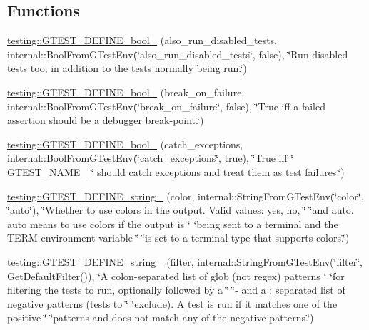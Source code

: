 \subsection*{Functions}
\begin{DoxyCompactItemize}
\item 
\mbox{\hyperlink{namespacetesting_ad72f215c805a46fba44cb09d717b01ef}{testing\+::\+G\+T\+E\+S\+T\+\_\+\+D\+E\+F\+I\+N\+E\+\_\+bool\+\_\+}} (also\+\_\+run\+\_\+disabled\+\_\+tests, internal\+::\+Bool\+From\+G\+Test\+Env(\char`\"{}also\+\_\+run\+\_\+disabled\+\_\+tests\char`\"{}, false), \char`\"{}Run disabled tests too, in addition to the tests normally being run.\char`\"{})
\item 
\mbox{\hyperlink{namespacetesting_a5ab9e9cc2ee1addddfb2f4b43dd4e402}{testing\+::\+G\+T\+E\+S\+T\+\_\+\+D\+E\+F\+I\+N\+E\+\_\+bool\+\_\+}} (break\+\_\+on\+\_\+failure, internal\+::\+Bool\+From\+G\+Test\+Env(\char`\"{}break\+\_\+on\+\_\+failure\char`\"{}, false), \char`\"{}True iff a failed assertion should be a debugger break-\/point.\char`\"{})
\item 
\mbox{\hyperlink{namespacetesting_a96c82869676822ec883043aefb6dd042}{testing\+::\+G\+T\+E\+S\+T\+\_\+\+D\+E\+F\+I\+N\+E\+\_\+bool\+\_\+}} (catch\+\_\+exceptions, internal\+::\+Bool\+From\+G\+Test\+Env(\char`\"{}catch\+\_\+exceptions\char`\"{}, true), \char`\"{}True iff \char`\"{} G\+T\+E\+S\+T\+\_\+\+N\+A\+M\+E\+\_\+ \char`\"{} should catch exceptions and treat them as \mbox{\hyperlink{_mutual_8h_a707ee03719e99670bf6cfdfd897b8456}{test}} failures.\char`\"{})
\item 
\mbox{\hyperlink{namespacetesting_a32f0280e95e7718835b0e3d2f7277269}{testing\+::\+G\+T\+E\+S\+T\+\_\+\+D\+E\+F\+I\+N\+E\+\_\+string\+\_\+}} (color, internal\+::\+String\+From\+G\+Test\+Env(\char`\"{}color\char`\"{}, \char`\"{}auto\char`\"{}), \char`\"{}Whether to use colors in the output.  Valid values\+: yes, no, \char`\"{} \char`\"{}and auto.  \textquotesingle{}auto\textquotesingle{} means to use colors if the output is \char`\"{} \char`\"{}being sent to a terminal and the T\+E\+RM environment variable \char`\"{} \char`\"{}is set to a terminal type that supports colors.\char`\"{})
\item 
\mbox{\hyperlink{namespacetesting_a2830ee1f2237233fa44aa580c5a919ce}{testing\+::\+G\+T\+E\+S\+T\+\_\+\+D\+E\+F\+I\+N\+E\+\_\+string\+\_\+}} (filter, internal\+::\+String\+From\+G\+Test\+Env(\char`\"{}filter\char`\"{}, Get\+Default\+Filter()), \char`\"{}A colon-\/separated list of glob (not regex) patterns \char`\"{} \char`\"{}for filtering the tests to run, optionally followed by a \char`\"{} \char`\"{}\textquotesingle{}-\/\textquotesingle{} and a \+: separated list of negative patterns (tests to \char`\"{} \char`\"{}exclude).  A \mbox{\hyperlink{_mutual_8h_a707ee03719e99670bf6cfdfd897b8456}{test}} is run if it matches one of the positive \char`\"{} \char`\"{}patterns and does not match any of the negative patterns.\char`\"{})

\end{DoxyCompactItemize}
